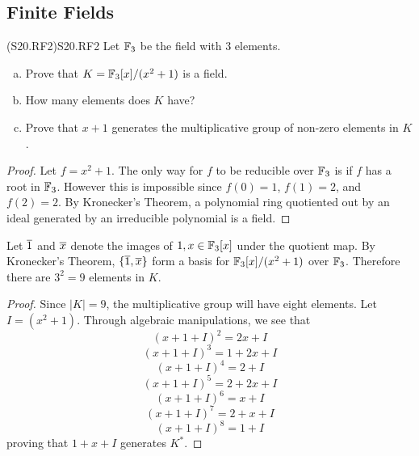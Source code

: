 \documentclass[../AlgebraQualSolutions.tex]{subfiles}
\begin{document}
\subsection{Finite Fields}

\begin{prob}{(S20.RF2)}{S20.RF2}
Let $\mathbb{F}_3$ be the field with 3 elements.
\begin{enumerate}[(a)]
\item Prove that $K = \mathbb{F}_3[x]/(x^2 + 1)$ is a field.
\item How many elements does $K$ have?
\item Prove that $x+1$ generates the multiplicative group of non-zero elements in $K$.
\end{enumerate}
\end{prob}

\begin{proof}
	Let $f = x^2 + 1$. The only way for $f$ to be reducible over $\mathbb{F}_3$ is if $f$ has a root in $\mathbb{F}_3$. However this is impossible since $f(0) = 1$, $f(1) = 2$, and $f(2) = 2$. By Kronecker's Theorem, a polynomial ring quotiented out by an ideal generated by an irreducible polynomial is a field.
\end{proof}

\begin{solution}
	Let $\overline{1}$ and $\overline{x}$ denote the images of $1,x \in \mathbb{F}_3[x]$ under the quotient map. By Kronecker's Theorem, $\{\overline{1},\overline{x}\}$ form a basis for $\mathbb{F}_3[x]/(x^2 + 1)$ over $\mathbb{F}_3$. Therefore there are $3^2 = 9$ elements in $K$.
\end{solution}

\begin{proof}
	Since $|K| = 9$, the multiplicative group will have eight elements. Let $I = (x^2 + 1)$. Through algebraic manipulations, we see that 
		\[(x+1+I)^2 = 2x + I\]
		\[(x+1+I)^3 = 1 + 2x + I\]
		\[(x+1+I)^4 = 2 + I\]
		\[(x+1+I)^5 = 2 + 2x + I\]
		\[(x+1+I)^6 = x + I\]
		\[(x+1+I)^7 = 2 + x + I\]
		\[(x+1+I)^8 = 1 + I\]
	proving that $1 + x + I$ generates $K^*$.
\end{proof}
\end{document}
